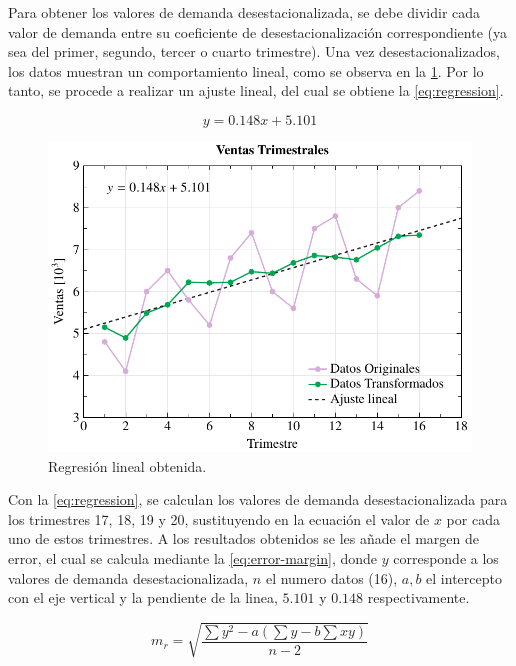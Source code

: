 Para obtener los valores de demanda desestacionalizada, se debe dividir cada
valor de demanda entre su coeficiente de desestacionalización correspondiente
(ya sea del primer, segundo, tercer o cuarto trimestre).
Una vez desestacionalizados, los datos muestran un comportamiento lineal, como
se observa en la \cref{fig:out-season-data}.
Por lo tanto, se procede a realizar un ajuste lineal, del cual se obtiene la
\cref{eq:regression}.

\begin{equation}
  y = 0.148x + 5.101
  \label{eq:regression}
\end{equation}

\begin{figure}[htpb!]
  \centering
  \includegraphics[width=\columnwidth]{../Figures/out-season-data.pdf}
  \caption{Regresión lineal obtenida.}
  \label{fig:out-season-data}
\end{figure}

Con la \cref{eq:regression}, se calculan los valores de demanda
desestacionalizada para los trimestres 17, 18, 19 y 20, sustituyendo en la
ecuación el valor de $x$ por cada uno de estos trimestres.
A los resultados obtenidos se les añade el margen de error, el cual se calcula
mediante la \cref{eq:error-margin}, donde \( y \) corresponde a los valores de
demanda desestacionalizada, \( n \) el numero datos (16), \( a, b \)
el intercepto con el eje vertical y la pendiente de la linea, \(5.101\) y \(0.148 \)
respectivamente.

\begin{equation}\label{eq:error-margin}
  m_r = \sqrt{\frac{\sum y^2 - a(\sum y - b\sum xy)}{n-2}}
\end{equation}

